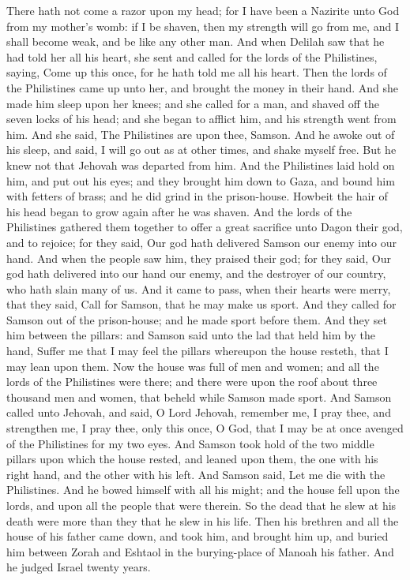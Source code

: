 There hath not come a razor upon my head; for I have been a Nazirite unto God from my mother’s womb: if I be shaven, then my strength will go from me, and I shall become weak, and be like any other man.  And when Delilah saw that he had told her all his heart, she sent and called for the lords of the Philistines, saying, Come up this once, for he hath told me all his heart. Then the lords of the Philistines came up unto her, and brought the money in their hand. And she made him sleep upon her knees; and she called for a man, and shaved off the seven locks of his head; and she began to afflict him, and his strength went from him. And she said, The Philistines are upon thee, Samson. And he awoke out of his sleep, and said, I will go out as at other times, and shake myself free. But he knew not that Jehovah was departed from him. And the Philistines laid hold on him, and put out his eyes; and they brought him down to Gaza, and bound him with fetters of brass; and he did grind in the prison-house. Howbeit the hair of his head began to grow again after he was shaven.  And the lords of the Philistines gathered them together to offer a great sacrifice unto Dagon their god, and to rejoice; for they said, Our god hath delivered Samson our enemy into our hand. And when the people saw him, they praised their god; for they said, Our god hath delivered into our hand our enemy, and the destroyer of our country, who hath slain many of us. And it came to pass, when their hearts were merry, that they said, Call for Samson, that he may make us sport. And they called for Samson out of the prison-house; and he made sport before them. And they set him between the pillars: and Samson said unto the lad that held him by the hand, Suffer me that I may feel the pillars whereupon the house resteth, that I may lean upon them. Now the house was full of men and women; and all the lords of the Philistines were there; and there were upon the roof about three thousand men and women, that beheld while Samson made sport.  And Samson called unto Jehovah, and said, O Lord Jehovah, remember me, I pray thee, and strengthen me, I pray thee, only this once, O God, that I may be at once avenged of the Philistines for my two eyes. And Samson took hold of the two middle pillars upon which the house rested, and leaned upon them, the one with his right hand, and the other with his left. And Samson said, Let me die with the Philistines. And he bowed himself with all his might; and the house fell upon the lords, and upon all the people that were therein. So the dead that he slew at his death were more than they that he slew in his life. Then his brethren and all the house of his father came down, and took him, and brought him up, and buried him between Zorah and Eshtaol in the burying-place of Manoah his father. And he judged Israel twenty years. 

